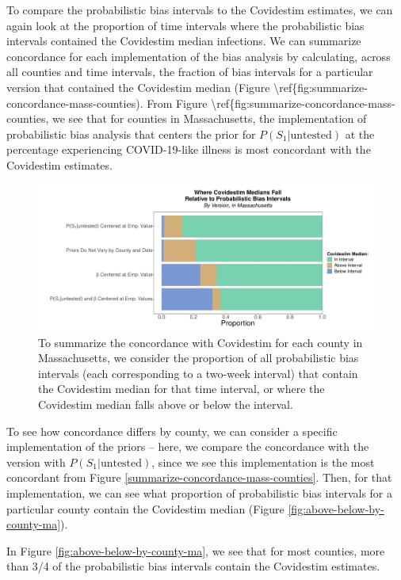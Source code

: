 \documentclass[12pt,twoside]{smiththesis}
\begin{document}
To compare the probabilistic bias intervals to the Covidestim estimates, we can again look at the proportion of time intervals where the probabilistic bias intervals contained the Covidestim median infections. We can summarize concordance for each implementation of the bias analysis by calculating, across all counties and time intervals, the fraction of bias intervals for a particular version that contained the Covidestim median (Figure \textbackslash ref\{fig:summarize-concordance-mass-counties). From Figure \textbackslash ref\{fig:summarize-concordance-mass-counties, we see that for counties in Massachusetts, the implementation of probabilistic bias analysis that centers the prior for \(P(S_1|\text{untested})\) at the percentage experiencing COVID-19-like illness is most concordant with the Covidestim estimates.
\begin{figure}
\includegraphics[width=1\linewidth]{figure/summarize-concordance-mass-counties} \caption{\label{fig:summarize-concordance-mass-counties} To summarize the concordance with Covidestim for each county in Massachusetts, we consider the proportion of all probabilistic bias intervals (each corresponding to a two-week interval) that contain the Covidestim median for that time interval, or where the Covidestim median falls above or below the interval.}\label{fig:unnamed-chunk-20}
\end{figure}
To see how concordance differs by county, we can consider a specific implementation of the priors -- here, we compare the concordance with the version with \(P(S_1|\text{untested})\), since we see this implementation is the most concordant from Figure \ref{summarize-concordance-mass-counties}. Then, for that implementation, we can see what proportion of probabilistic bias intervals for a particular county contain the Covidestim median (Figure \ref{fig:above-below-by-county-ma}).

In Figure \ref{fig:above-below-by-county-ma}, we see that for most counties, more than 3/4 of the probabilistic bias intervals contain the Covidestim estimates.
\end{document}
